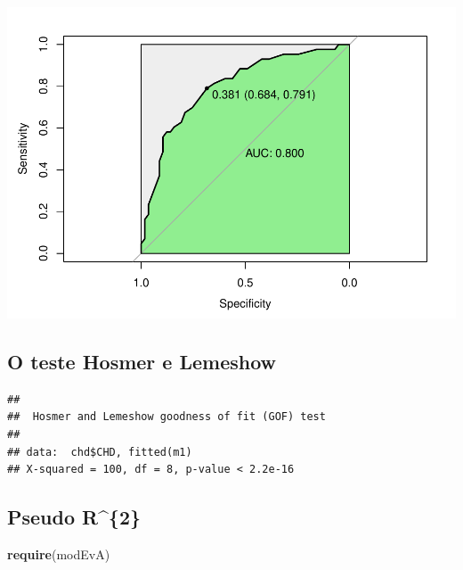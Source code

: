 \documentclass[12pt,brazil,]{book}
\newenvironment{Shaded}{\begin{snugshade}}{\end{snugshade}}
\newcommand{\DataTypeTok}[1]{\textcolor[rgb]{0.13,0.29,0.53}{#1}}
\newcommand{\DecValTok}[1]{\textcolor[rgb]{0.00,0.00,0.81}{#1}}
\newcommand{\KeywordTok}[1]{\textcolor[rgb]{0.13,0.29,0.53}{\textbf{#1}}}
\newcommand{\NormalTok}[1]{#1}
\newcommand{\OperatorTok}[1]{\textcolor[rgb]{0.81,0.36,0.00}{\textbf{#1}}}
\begin{document}
\includegraphics{05-RegLogist_files/figure-latex/unnamed-chunk-11-1.pdf}

\hypertarget{o-teste-hosmer-e-lemeshow}{%
\subsection{O teste Hosmer e Lemeshow}\label{o-teste-hosmer-e-lemeshow}}

\begin{Shaded}
\end{Shaded}

\begin{verbatim}
## 
##  Hosmer and Lemeshow goodness of fit (GOF) test
## 
## data:  chd$CHD, fitted(m1)
## X-squared = 100, df = 8, p-value < 2.2e-16
\end{verbatim}

\hypertarget{pseudo-r2}{%
\subsection{Pseudo R\^{}\{2\}}\label{pseudo-r2}}

\begin{Shaded}
\begin{Highlighting}[]
\KeywordTok{require}\NormalTok{(modEvA)}
\end{Highlighting}
\end{Shaded}
\end{document}
